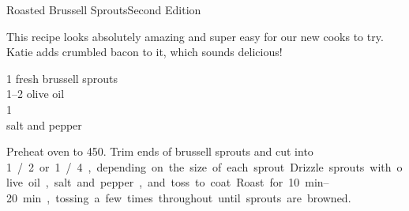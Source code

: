 \begin{entry}{Roasted Brussell Sprouts}{Second Edition}

\begin{open}
 This recipe looks absolutely amazing and super easy for our new cooks to try. Katie adds crumbled bacon to it, which sounds delicious!
\end{open}
\begin{ingredients}
    \SI{1}{\pound} fresh brussell sprouts \\
    \SIrange{1}{2}{\tblspoon} olive oil\\
    \SI{1}{\tblspoon} \\
    salt and pepper\\
\end{ingredients}
Preheat oven to \SI{450}{\degreeF}. Trim ends of brussell sprouts and cut into \SI{1}/{2} or \SI{1}/{4}, depending on the size of each sprout. Drizzle sprouts with olive oil, salt and pepper, and toss to coat. 
Roast for \SIrange{10}{20}{\minute}, tossing a few times throughout until sprouts are browned.
\end{entry}

